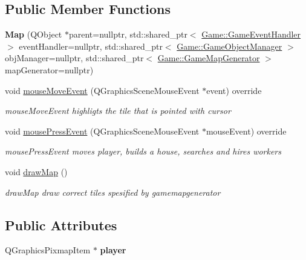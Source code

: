 \subsection*{Public Member Functions}
\begin{DoxyCompactItemize}
\item 
\hypertarget{class_game_1_1_map_ab35bc9a7f6eb93296195984acc3a7b91}{{\bfseries Map} (Q\-Object $\ast$parent=nullptr, std\-::shared\-\_\-ptr$<$ \hyperlink{class_game_1_1_game_event_handler}{Game\-::\-Game\-Event\-Handler} $>$ event\-Handler=nullptr, std\-::shared\-\_\-ptr$<$ \hyperlink{class_game_1_1_game_object_manager}{Game\-::\-Game\-Object\-Manager} $>$ obj\-Manager=nullptr, std\-::shared\-\_\-ptr$<$ \hyperlink{class_game_1_1_game_map_generator}{Game\-::\-Game\-Map\-Generator} $>$ map\-Generator=nullptr)}\label{class_game_1_1_map_ab35bc9a7f6eb93296195984acc3a7b91}

\item 
void \hyperlink{class_game_1_1_map_ad321530ce793b6aa4e0717f5273e3da5}{mouse\-Move\-Event} (Q\-Graphics\-Scene\-Mouse\-Event $\ast$event) override
\begin{DoxyCompactList}\small\item\em mouse\-Move\-Event highligts the tile that is pointed with cursor \end{DoxyCompactList}\item 
void \hyperlink{class_game_1_1_map_acd0b3b07cca5ead1401cf7eda3ad0e17}{mouse\-Press\-Event} (Q\-Graphics\-Scene\-Mouse\-Event $\ast$mouse\-Event) override
\begin{DoxyCompactList}\small\item\em mouse\-Press\-Event moves player, builds a house, searches and hires workers \end{DoxyCompactList}\item 
\hypertarget{class_game_1_1_map_aca53e9bced941a53bbb8778e051cbad0}{void \hyperlink{class_game_1_1_map_aca53e9bced941a53bbb8778e051cbad0}{draw\-Map} ()}\label{class_game_1_1_map_aca53e9bced941a53bbb8778e051cbad0}

\begin{DoxyCompactList}\small\item\em draw\-Map draw correct tiles spesified by gamemapgenerator \end{DoxyCompactList}\end{DoxyCompactItemize}
\subsection*{Public Attributes}
\begin{DoxyCompactItemize}
\item 
\hypertarget{class_game_1_1_map_a08834c1eca0831fc938d16bad5e56428}{Q\-Graphics\-Pixmap\-Item $\ast$ {\bfseries player}}\label{class_game_1_1_map_a08834c1eca0831fc938d16bad5e56428}

\end{DoxyCompactItemize}


